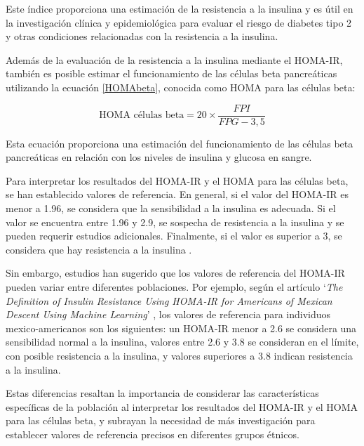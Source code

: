 Este índice proporciona una estimación de la resistencia a la insulina y es útil en la investigación clínica y epidemiológica para evaluar el riesgo de diabetes tipo 2 y otras condiciones relacionadas con la resistencia a la insulina.

Además de la evaluación de la resistencia a la insulina mediante el HOMA-IR, también es posible estimar el funcionamiento de las células beta pancreáticas utilizando la ecuación \eqref{HOMAbeta}, conocida como HOMA para las células beta:

\begin{equation}\label{HOMAbeta}
    \text{HOMA células beta} =  20 \times \frac{FPI}{FPG -3,5}
\end{equation}

Esta ecuación proporciona una estimación del funcionamiento de las células beta pancreáticas en relación con los niveles de insulina y glucosa en sangre.

Para interpretar los resultados del HOMA-IR y el HOMA para las células beta, se han establecido valores de referencia. En general, si el valor del HOMA-IR es menor a 1.96, se considera que la sensibilidad a la insulina es adecuada. Si el valor se encuentra entre 1.96 y 2.9, se sospecha de resistencia a la insulina y se pueden requerir estudios adicionales. Finalmente, si el valor es superior a 3, se considera que hay resistencia a la insulina \cite{limiteHOMA}.

Sin embargo, estudios han sugerido que los valores de referencia del HOMA-IR pueden variar entre diferentes poblaciones. Por ejemplo, según el artículo `\textit{The Definition of Insulin Resistance Using HOMA-IR for Americans of Mexican Descent Using Machine Learning}' \cite{HOMAMex}, los valores de referencia para individuos mexico-americanos son los siguientes: un HOMA-IR menor a 2.6 se considera una sensibilidad normal a la insulina, valores entre 2.6 y 3.8 se consideran en el límite, con posible resistencia a la insulina, y valores superiores a 3.8 indican resistencia a la insulina.

Estas diferencias resaltan la importancia de considerar las características específicas de la población al interpretar los resultados del HOMA-IR y el HOMA para las células beta, y subrayan la necesidad de más investigación para establecer valores de referencia precisos en diferentes grupos étnicos.



